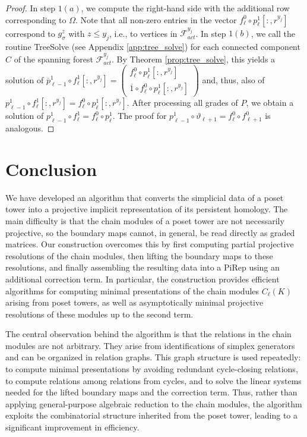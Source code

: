 \documentclass[english,a4paper,nolineno,cleveref]{socg-lipics-v2021}
\begin{document}
\begin{proof}
In step $1(a)$, we compute the right-hand side with the additional row corresponding to $\Omega$. Note that all non-zero entries in the vector $f^0_\ell\circ p_\ell^1[:,r^{y_j}]$ correspond to $g_\sigma^z$ with $z\leq y_j$, i.e., to vertices in $\mathcal{F}_{act}^{y_j}$. In step $1(b)$, we call the routine {\sc TreeSolve} (see Appendix \ref{app:tree_solve}) for each connected component $C$ of the spanning forest $\mathcal{F}_{act}^{y_j}$. By Theorem \ref{prop:tree_solve}, this yields a solution of $\overline{p}_{\ell\minus 1}^1\circ f^1_\ell[:,r^{y_j}]=\begin{pmatrix}f^0_\ell\circ p_\ell^1[:,r^{y_j}] \\ \overline{1}\circ f^0_\ell\circ p_\ell^1[:,r^{y_j}]\end{pmatrix}$ and, thus, also of $p_{\ell\minus 1}^1\circ f^1_\ell[:,r^{y_j}]=f^0_\ell\circ p_\ell^1[:,r^{y_j}]$. After processing all grades of $P$, we obtain a solution of $p_{\ell\minus 1}^1\circ f^1_\ell=f^0_\ell\circ p_\ell^1$. The proof for $p_{\ell\minus 1}^1\circ\vartheta_{\ell+1}=f^0_\ell\circ f^0_{\ell+1}$ is analogous. 
\end{proof}


\section{Conclusion} \label{sec:conclusion}

We have developed an algorithm that converts the simplicial data of a poset
tower into a projective implicit representation of its persistent homology.
The main difficulty is that the chain modules of a poset tower are not
necessarily projective, so the boundary maps cannot, in general, be
read directly as graded matrices. Our construction overcomes this by first
computing partial projective resolutions of the chain modules, then lifting the
boundary maps to these resolutions, and finally assembling the resulting
data into a PiRep using an additional correction term. In particular, 
the construction provides efficient algorithms for
computing minimal presentations of the chain modules $C_\ell(K)$ arising
from poset towers, as well as asymptotically minimal projective resolutions
of these modules up to the second term.

The central observation behind the algorithm is that the relations in the
chain modules are not arbitrary. They arise from identifications of simplex
generators and can be organized in relation graphs. This graph structure is
used repeatedly: to compute minimal presentations by avoiding redundant
cycle-closing relations, to compute relations among relations from cycles,
and to solve the linear systems needed for the lifted boundary maps and the
correction term. Thus, rather than applying general-purpose algebraic reduction to the chain
modules, the algorithm exploits the combinatorial structure inherited from
the poset tower, leading to a significant improvement in efficiency.
\end{document}
